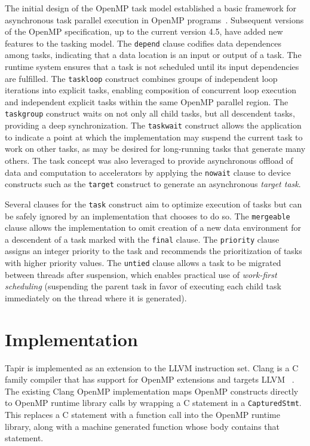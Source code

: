 \documentclass[sigconf]{acmart}
\begin{document}
The initial design of the OpenMP task model established
a basic framework for asynchronous task parallel execution in OpenMP programs~\cite{ayguade09design}.
Subsequent versions of the OpenMP specification, up to the current version 4.5,
have added new features to the tasking model.  The \texttt{depend}
clause codifies data dependences among tasks, indicating that a data location
is an input or output of a task.  The runtime system ensures that a task is
not scheduled until its input dependencies are fulfilled.  The \texttt{taskloop}
construct combines groups of independent loop iterations into explicit tasks,
enabling composition of concurrent loop execution and independent explicit
tasks within the same OpenMP parallel region. The \texttt{taskgroup} construct
waits on not only all child tasks, but all descendent tasks, providing a deep
synchronization. The \texttt{taskwait} construct allows the application to
indicate a point at which the implementation may suspend the current task to
work on other tasks, as may be desired for long-running tasks that generate
many others.  The task concept was also leveraged to provide asynchronous
offload of data and computation to accelerators by applying the \texttt{nowait}
clause to device constructs such as the \texttt{target} construct to generate an
asynchronous \textit{target task}.

Several clauses for the \texttt{task} construct aim to optimize execution of
tasks but can be safely ignored by an implementation that chooses to do so.
The \texttt{mergeable} clause allows the implementation to omit creation of a
new data environment for a descendent of a task marked with the \texttt{final}
clause.  The \texttt{priority} clause assigns an integer priority to the task
and recommends the prioritization of tasks with higher priority values.
The \texttt{untied} clause allows a task to be migrated between threads after
suspension, which enables practical use of \textit{work-first scheduling}
(suspending the parent task in favor of executing each child task immediately
on the thread where it is generated).

\section{Implementation} \label{Sec:Implementation}

Tapir is implemented as an extension to the LLVM instruction set. Clang is a C
family compiler that has support for OpenMP extensions and targets
LLVM~ \cite{clang}. The existing Clang OpenMP implementation maps OpenMP constructs directly
to OpenMP runtime library calls by wrapping a C statement in a
\texttt{CapturedStmt}. This replaces a C statement with a function call into
the OpenMP runtime library, along with a machine generated function whose body
contains that statement.
\end{document}
